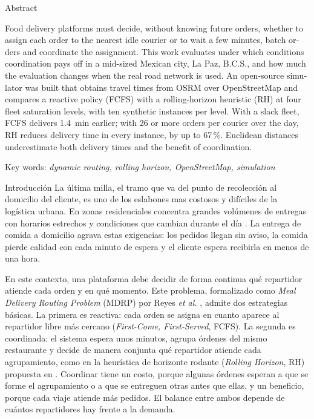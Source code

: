 \documentclass[10pt]{article}
\makeatletter
\renewcommand{\section}{\@startsection{section}{1}{0pt}{8pt}{0.1pt}
  {\semibold\fontsize{12}{14.6}\selectfont\color{riimazul}\raggedright}}
\makeatother
\begin{document}
\section{Abstract}
\begin{otherlanguage}{english}\frenchspacing
Food delivery platforms must decide, without knowing future orders, whether to assign each order to
the nearest idle courier or to wait a few minutes, batch orders and coordinate the assignment. This
work evaluates under which conditions coordination pays off in a mid-sized Mexican city, La Paz,
B.C.S., and how much the evaluation changes when the real road network is used. An open-source
simulator was built that obtains travel times from OSRM over OpenStreetMap and compares a reactive
policy (FCFS) with a rolling-horizon heuristic (RH) at four fleet saturation levels, with ten
synthetic instances per level. With a slack fleet, FCFS delivers 1.4~min earlier; with 26 or more
orders per courier over the day, RH reduces delivery time in every instance, by up to 67\,\%.
Euclidean distances underestimate both delivery times and the benefit of coordination.

{\semibold\fontsize{12}{14.6}\selectfont\color{riimazul}Key words}: \textit{dynamic routing, rolling horizon, OpenStreetMap, simulation}
\end{otherlanguage}

\section{Introducción}
La última milla, el tramo que va del punto de recolección al domicilio del cliente, es uno de los
eslabones mas costosos y difíciles de la logística urbana. En zonas residenciales concentra grandes
volúmenes de entregas con horarios estrechos y condiciones que cambian durante el día
\cite{Jazemi2023}. La entrega de comida a domicilio agrava estas exigencias: los pedidos llegan sin
aviso, la comida pierde calidad con cada minuto de espera y el cliente espera recibirla en menos de
una hora.

En este contexto, una plataforma debe decidir de forma continua qué repartidor atiende cada orden y
en qué momento. Este problema, formalizado como \textit{Meal Delivery Routing Problem} (MDRP) por
Reyes \textit{et al.} \cite{Reyes2018}, admite dos estrategias básicas. La primera es reactiva: cada
orden se asigna en cuanto aparece al repartidor libre más cercano (\textit{First-Come, First-Served},
FCFS). La segunda es coordinada: el sistema espera unos minutos, agrupa órdenes del mismo restaurante
y decide de manera conjunta qué repartidor atiende cada agrupamiento, como en la heurística de
horizonte rodante (\textit{Rolling Horizon}, RH) propuesta en \cite{Reyes2018}. Coordinar tiene un
costo, porque algunas órdenes esperan a que se forme el agrupamiento o a que se entreguen otras antes
que ellas, y un beneficio, porque cada viaje atiende más pedidos. El balance entre ambos depende de
cuántos repartidores hay frente a la demanda.
\end{document}
